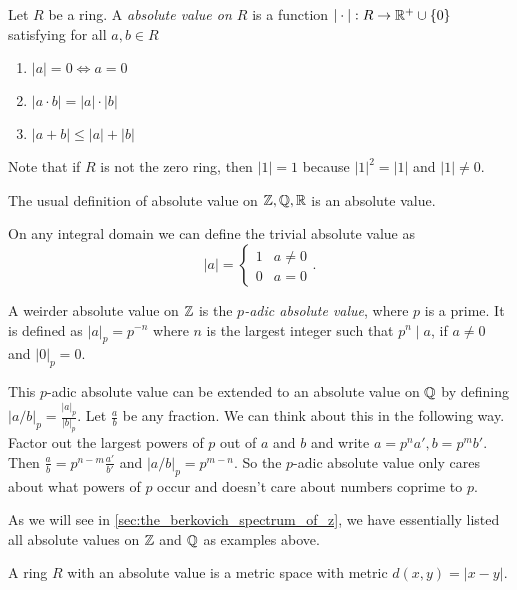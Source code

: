 \begin{definition}
	Let $R$ be a ring. A \emph{absolute value on $R$} is a function
	$|\cdot |: R \to \mathbb{R}^{+} \cup \{0\} $ satisfying for all $a, b \in R$
	\begin{enumerate}
		\item $|a| = 0 \iff a = 0$ 
		\item $|a \cdot b| = |a| \cdot |b|$ 
		\item $|a + b| \le |a| + |b|$
	\end{enumerate}
\end{definition}
Note that if $R$ is not the zero ring, then $|1| = 1$ because $|1|^2 = |1| $ and $|1|\ne 0 $. 
\begin{example}
	The usual definition of absolute value on $\mathbb{Z}, \mathbb{Q}, \mathbb{R}$ is an absolute value. 
\end{example}
\begin{example}
	On any integral domain we can define the trivial absolute value as \[
	 |a| = \begin{cases}
		 1 & a \ne 0 \\
		 0 & a = 0
	 \end{cases}
	.\] 
\end{example}
\begin{example}
	A weirder absolute value on $\mathbb{Z}$ is the \emph{$p$-adic absolute value}, where $p$ is a prime. 
	It is defined as $|a|_p = p^{-n}$ where $n$ is the largest integer such that $p^{n} \mid a$, if $a \ne 0$ and $|0|_p = 0$. 


	This $p$-adic absolute value can be extended to an absolute value on $\mathbb{Q}$ by defining $|a / b|_p = \frac{|a|_p}{|b|_p}$. Let $\frac{a}{b}$ be any fraction. 
	We can think about this in the following way. 
	Factor out the largest powers of $p$ out of $a$ and $b$ and write $a = p^{n} a', b = p^{m} b'$. Then $\frac{a}{ b} = p^{n - m} \frac{a'}{ b'}$ and $|a / b|_p = p^{m - n}$. 
	So the $p$-adic absolute value only cares about what powers of $p$ occur and doesn't care about numbers coprime to $p $.
\end{example}
As we will see in \cref{sec:the_berkovich_spectrum_of_z}, we have essentially listed all absolute values on $\mathbb{Z}$ and $\mathbb{Q}$ as examples above.  
\begin{observation}
	A ring $R$ with an absolute value is a metric space with metric $d(x, y) = |x - y|$. 
\end{observation}
